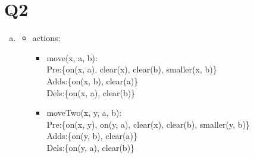 \documentclass[a4paper, 11pt]{article}
\begin{document}
\section{Q2}
\begin{enumerate}[(a)]
  \item
  \begin{itemize}
    \item actions:
      \begin{itemize}
        \item move(x, a, b):\\
        Pre:\{on(x, a), clear(x), clear(b), smaller(x, b)\}\\
        Adds:\{on(x, b), clear(a)\}\\
        Dels:\{on(x, a), clear(b)\}
        \item moveTwo(x, y, a, b):\\
            Pre:\{on(x, y), on(y, a), clear(x), clear(b), smaller(y, b)\}\\
            Adds:\{on(y, b), clear(a)\}\\
            Dels:\{on(y, a), clear(b)\}
      \end{itemize}


\end{itemize}
\end{enumerate}
\end{document}
